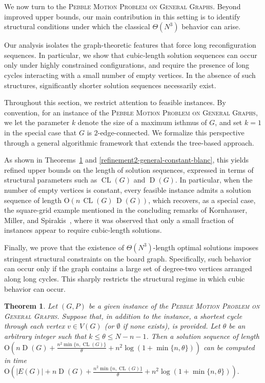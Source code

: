 \documentclass[letter,11pt]{article}
\newtheorem{thm}{Theorem}
\theoremstyle{definition}
\theoremstyle{definition}
\DeclareMathOperator{\D}{D}
\DeclareMathOperator{\CL}{CL}
\newcommand{\1}{\boldmath$~1~$\unboldmath}
\newcommand{\Ord}{\mathrm{O}}
\begin{document}
We now turn to the \textsc{Pebble Motion Problem on General Graphs}.
Beyond improved upper bounds, our main contribution in this setting is
to identify structural conditions under which the classical $\Theta(N^3)$ 
behavior can arise.

Our analysis isolates the graph-theoretic features that force long
reconfiguration sequences.
In particular, we show that cubic-length solution sequences can occur
only under highly constrained configurations, and require the presence of 
long cycles interacting with a small number of empty vertices.
In the absence of such structures, significantly shorter solution
sequences necessarily exist.

Throughout this section, we restrict attention to feasible instances.
By convention, for an instance of the \textsc{Pebble Motion Problem on General Graphs},
we let the parameter $k$ denote the size of a maximum isthmus of $G$,
and set $k=1$ in the special case that $G$ is $2$-edge-connected.
We formalize this perspective through a general algorithmic framework
that extends the tree-based approach.

As shown in Theorems~\ref{main2} and \ref{refinement2-general-constant-blanc},
this yields refined upper bounds on the length of solution sequences,
expressed in terms of structural parameters such as
$\CL(G)$ and $\D(G)$.
In particular, when the number of empty vertices is constant,
every feasible instance admits a solution sequence of length
$\Ord(n\,\CL(G)\,\D(G))$,
which recovers, as a special case, the square-grid example
mentioned in the concluding remarks of
Kornhauser, Miller, and Spirakis~\cite{715921},
where it was observed that only a small fraction of instances
appear to require cubic-length solutions.

Finally, we prove that the existence of $\Theta(N^3)$-length optimal
solutions imposes stringent structural constraints on the board graph.
Specifically, such behavior can occur only if the graph contains a large
set of degree-two vertices arranged along long cycles.
This sharply restricts the structural regime in which cubic behavior can occur.
\begin{thm}\label{main2}
Let $(G, P)$ be a given instance of the \textsc{Pebble Motion Problem on General Graphs}.  
Suppose that, in addition to the instance, %
a shortest cycle through each vertex $v \in V(G)$ (or $\emptyset$ if none exists), 
is provided. 
Let $\theta$ be an arbitrary integer such that $k \leq \theta \leq N - n - 1$.
Then a solution sequence of length 
$\Ord(n\D(G)+\frac{n^2\min\{n,\CL(G)\}}{\theta}+n^2\log(1+\min\{n, \theta\}))$ 
can be computed in time %
$\Ord(|E(G)|+n\D(G)+\frac{n^2\min\{n,\CL(G)\}}{\theta}+n^2\log(1+\min\{n, \theta\})).$ 
\end{thm}
\end{document}
